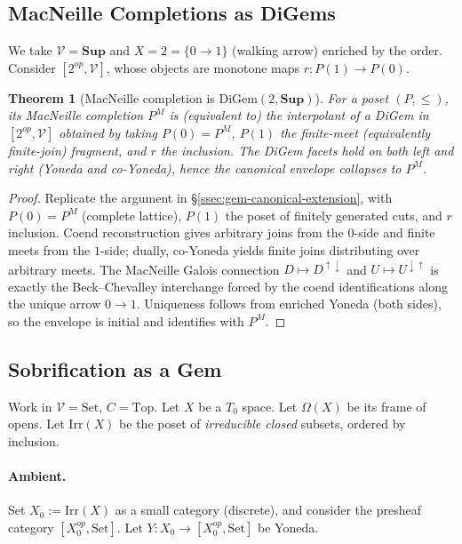 \documentclass[11pt]{article}
\theoremstyle{plain}
\newtheorem{theorem}{Theorem}[section]
\theoremstyle{definition}
\theoremstyle{remark}
\newcommand{\V}{\mathcal{V}}
\newcommand{\Top}{\mathrm{Top}}
\newcommand{\Set}{\mathrm{Set}}
\begin{document}
\subsection{MacNeille Completions as DiGems}\label{ssec:digem-macneille}

We take $\V=\mathbf{Sup}$ and $X=2=\{0\to 1\}$ (walking arrow) enriched by the order. Consider $[2^{op},\V]$, whose objects are monotone maps $r:P(1)\to P(0)$.

\begin{theorem}[MacNeille completion is DiGem$(2,\mathbf{Sup})$]
For a poset $(P,\le)$, its MacNeille completion $P^M$ is (equivalent to) the interpolant of a DiGem in $[2^{op},\V]$ obtained by taking $P(0)=P^M$, $P(1)$ the finite-meet (equivalently finite-join) fragment, and $r$ the inclusion. The DiGem facets hold on both left and right (Yoneda and co-Yoneda), hence the canonical envelope collapses to $P^M$.
\end{theorem}

\begin{proof}
Replicate the argument in \S\ref{ssec:gem-canonical-extension}, with $P(0)=P^M$ (complete lattice), $P(1)$ the poset of finitely generated cuts, and $r$ inclusion. Coend reconstruction gives arbitrary joins from the $0$-side and finite meets from the $1$-side; dually, co-Yoneda yields finite joins distributing over arbitrary meets. The MacNeille Galois connection $D\mapsto D^{\uparrow\downarrow}$ and $U\mapsto U^{\downarrow\uparrow}$ is exactly the Beck–Chevalley interchange forced by the coend identifications along the unique arrow $0\to 1$. Uniqueness follows from enriched Yoneda (both sides), so the envelope is initial and identifies with $P^M$.
\end{proof}

\subsection{Sobrification as a Gem}\label{ssec:gem-sobrification}

Work in $\V=\Set$, $C=\Top$. Let $X$ be a $T_0$ space. Let $\Omega(X)$ be its frame of opens. Let $\mathrm{Irr}(X)$ be the poset of \emph{irreducible closed} subsets, ordered by inclusion.

\paragraph{Ambient.}
Set $X_0:=\mathrm{Irr}(X)$ as a small category (discrete), and consider the presheaf category $[X_0^{op},\Set]$. Let $Y:X_0\to [X_0^{op},\Set]$ be Yoneda.
\end{document}
